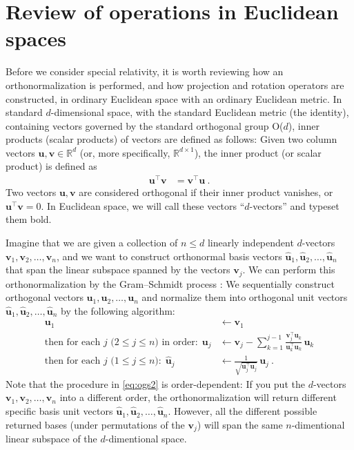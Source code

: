 \documentclass{article}
\newcommand{\Evec}[1]{{\mathbf{#1}}} %
\newcommand{\Ehat}[1]{{\mathbf{\hat{#1}}}} %
\begin{document}
\section{Review of operations in Euclidean spaces}\label{sec:od}

Before we consider special relativity, it is worth reviewing how an orthonormalization is performed, and how projection and rotation operators are constructed, in ordinary Euclidean space with an ordinary Euclidean metric.
In standard $d$-dimensional space, with the standard Euclidean metric (the identity), containing vectors governed by the standard orthogonal group O($d$), inner products (scalar products) of vectors are defined as follows:
Given two column vectors $\Evec{u},\Evec{v}\in\mathbb{R}^d$ (or, more specifically, $\mathbb{R}^{d\times1}$), the inner product (or scalar product) is defined as
\begin{align}
    \Evec{u}^\top \Evec{v} &= \Evec{v}^\top \Evec{u} ~.
\end{align}
Two vectors $\Evec{u},\Evec{v}$ are considered orthogonal if their inner product vanishes, or $\Evec{u}^\top\Evec{v}=0$.
In Euclidean space, we will call these vectors ``$d$-vectors'' and typeset them bold.

Imagine that we are given a collection of $n\leq d$ linearly independent $d$-vectors $\Evec{v}_1,\Evec{v}_2,\ldots,\Evec{v}_n$,
and we want to construct orthonormal basis vectors $\Ehat{u}_1,\Ehat{u}_2,\ldots,\Ehat{u}_n$ that span the linear subspace spanned by the vectors $\Evec{v}_j$.
We can perform this orthonormalization by the Gram--Schmidt process \cite{gramschmidt}:
We sequentially construct orthogonal vectors $\Evec{u}_1,\Evec{u}_2,\ldots,\Evec{u}_n$ and normalize them into orthogonal unit vectors $\Ehat{u}_1,\Ehat{u}_2,\ldots,\Ehat{u}_n$ by the following algorithm:
\begin{align}
    \Evec{u}_1 &\leftarrow \Evec{v}_1 \label{eq:ogs1}
    \\
    \mbox{then for each $j$ ($2\leq j\leq n$) in order:} ~~ \Evec{u}_j &\leftarrow \Evec{v}_j - \sum_{k=1}^{j-1} \frac{\Evec{v}_j^\top\Evec{u}_k}{\Evec{u}_k^\top\Evec{u}_k}\,\Evec{u}_k \label{eq:ogs2}
    \\
    \mbox{then for each $j$ ($1\leq j\leq n$):} ~~ \Ehat{u}_j &\leftarrow \frac{1}{\sqrt{\Evec{u}_j^\top\Evec{u}_j}}\,\Evec{u}_j ~. \label{eq:ogs3}
\end{align}
Note that the procedure in \eqref{eq:ogs2} is order-dependent: If you put the $d$-vectors $\Evec{v}_1,\Evec{v}_2,\ldots,\Evec{v}_n$ into a different order, the orthonormalization will return different specific basis unit vectors $\Ehat{u}_1,\Ehat{u}_2,\ldots,\Ehat{u}_n$.
However, all the different possible returned bases (under permutations of the $\Evec{v}_j$) will span the same $n$-dimentional linear subspace of the $d$-dimentional space.
\end{document}
